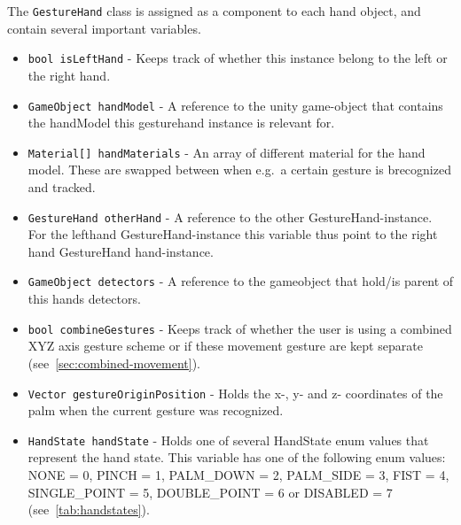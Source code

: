 The \texttt{GestureHand} class is assigned as a component to each hand object, and contain several important variables.
\begin{itemize}
	\item \texttt{bool isLeftHand} - Keeps track of whether this instance belong to the left or the right hand.
	\item \texttt{GameObject handModel} - A reference to the unity game-object that contains the handModel this gesturehand instance is relevant for.
	\item \texttt{Material[] handMaterials} - An array of different material for the hand model. These are swapped between when e.g.~a certain gesture is brecognized and tracked.
	\item \texttt{GestureHand otherHand} - A reference to the other GestureHand-instance. For the lefthand GestureHand-instance this variable thus point to the right hand GestureHand
			hand-instance.
	\item \texttt{GameObject detectors} - A reference to the gameobject that hold/is parent of this hands detectors.
	\item \texttt{bool combineGestures} - Keeps track of whether the user is using a combined XYZ axis gesture scheme or if these movement gesture are kept separate (see~\vref{sec:combined-movement}).
	\item \texttt{Vector gestureOriginPosition} - Holds the x-, y- and z- coordinates of the palm when the current gesture was recognized.
	\item \texttt{HandState handState} - Holds one of several HandState enum values that represent the hand state. This variable has one of the following enum values:
			NONE = 0, PINCH = 1, PALM\_DOWN = 2, PALM\_SIDE = 3, FIST = 4, SINGLE\_POINT = 5, DOUBLE\_POINT = 6 or DISABLED = 7 (see~\vref{tab:handstates}).  
\end{itemize}

